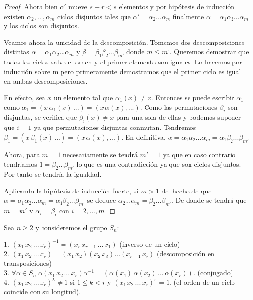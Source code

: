 \begin{proof}
Ahora bien $\alpha'$ mueve $s-r < s$ elementos y por hipótesis de inducción existen $\alpha_2,...,\alpha_m$ ciclos disjuntos tales que $\alpha' = \alpha_2...\alpha_m$ finalmente $\alpha = \alpha_1\alpha_2...\alpha_m$ y los ciclos son disjuntos.

Veamos ahora la unicidad de la descomposición. Tomemos dos descomposiciones distintas $\alpha = \alpha_1\alpha_2...\alpha_m$ y $\beta = \beta_1\beta_2...\beta_{m'}$ donde $m \le m'$. Queremos demostrar que todos los ciclos salvo el orden y el primer elemento son iguales. Lo hacemos por inducción sobre m pero primeramente demostramos que el primer ciclo es igual en ambas descomposiciones.

En efecto, sea $x$ un elemento tal que $\alpha_1(x) \neq x$. Entonces se puede escribir $\alpha_1$ como $\alpha_1 = (x \, \alpha_1(x) \, ...) = (x \, \alpha(x),...)$. Como las permutaciones $\beta_i$ son disjuntas, se verifica que $\beta_i(x) \neq x$ para una sola de ellas y podemos suponer que $i = 1$ ya que permutaciones disjuntas conmutan. Tendremos $\beta_1 = (x \, \beta_1(x) \, ...) = (x \, \alpha(x),...)$. En definitiva, $\alpha = \alpha_1\alpha_2...\alpha_m = \alpha_1\beta_2...\beta_{m'}$

Ahora, para $m = 1$ necesariamente se tendrá $m' = 1$ ya que en caso contrario tendríamos $1 = \beta_2...\beta_{m'}$ lo que es una contradicción ya que son ciclos disjuntos. Por tanto se tendría la igualdad. 

Aplicando la hipótesis de inducción fuerte, si $m > 1$ del hecho de que $\alpha = \alpha_1\alpha_2...\alpha_m = \alpha_1\beta_2...\beta_{m'}$ se deduce $\alpha_2...\alpha_m = \beta_2...\beta_{m'}$. De donde se tendrá que $m = m'$ y $\alpha_i = \beta_i$ con $i=2,...,m$.
\end{proof}

\begin{proposition}\label{proposition:propiedades-ciclos}
Sea $n \ge 2$ y consideremos el grupo $S_n$:

1. $(x_1 \, x_2 \, ... \, x_r)^{-1} = (x_r \, x_{r-1} \, ... \, x_1)$ (inverso de un ciclo)\\
2. $(x_1 \, x_2 \, ... \, x_r) = (x_1 \, x_2)(x_2 \, x_3)...(x_{r-1} \, x_r)$ (descomposición en transposiciones)\\
3. $\forall \alpha \in S_n \; \alpha (x_1 \, x_2 \, ... \, x_r) \alpha^{-1} = (\alpha(x_1) \, \alpha(x_2) \, ... \, \alpha(x_r))$. (conjugado)\\
4. $(x_1 \, x_2 \, ... \, x_r)^k \neq 1$ si $1 \le k < r$ y $(x_1 \, x_2 \, ... \, x_r)^r = 1$. (el orden de un ciclo coincide con su longitud).
\end{proposition}

